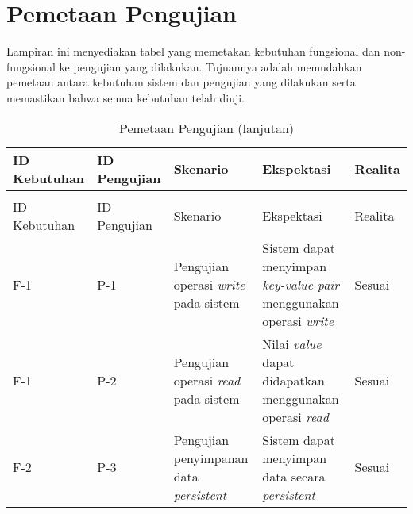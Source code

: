 \chapter{Pemetaan Pengujian}
\label{appendix:pemetaan-pengujian}

Lampiran ini menyediakan tabel yang memetakan kebutuhan fungsional dan non-fungsional ke pengujian yang dilakukan. Tujuannya adalah memudahkan pemetaan antara kebutuhan sistem dan pengujian yang dilakukan serta memastikan bahwa semua kebutuhan telah diuji.

\begin{longtable}{|l|l|p{3cm}|p{3cm}|l|}
\caption{Pemetaan Pengujian}
\label{tab:pemetaan-pengujian} \\
\hline
\rowcolor{black!10} ID Kebutuhan & ID Pengujian & Skenario & Ekspektasi & Realita \\ \hline
\endfirsthead

\caption[]{Pemetaan Pengujian (lanjutan)} \\
\hline
\rowcolor{black!10} ID Kebutuhan & ID Pengujian & Skenario & Ekspektasi & Realita \\ \hline
\endhead

F-1 & P-1 & Pengujian operasi \textit{write} pada sistem & Sistem dapat menyimpan \textit{key-value pair} menggunakan operasi \textit{write} & Sesuai \\ \hline
F-1 & P-2 & Pengujian operasi \textit{read} pada sistem & Nilai \textit{value} dapat didapatkan menggunakan operasi \textit{read} & Sesuai \\ \hline
F-2 & P-3 & Pengujian penyimpanan data \textit{persistent} & Sistem dapat menyimpan data secara \textit{persistent} & Sesuai \\ \hline
\end{longtable}